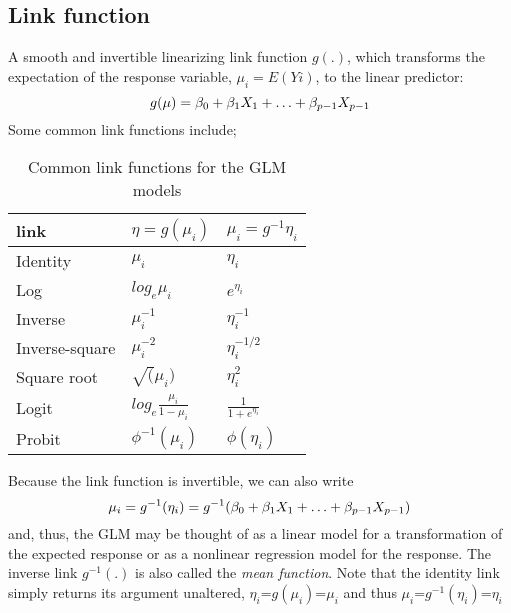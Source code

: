 \subsection{Link function}
A smooth and invertible linearizing link function $g(.)$, which transforms the expectation of the response variable, $\mu_i = E(Yi)$, to the linear predictor:
\begin{equation}
	\centering
	g(\mu) = \beta_0 + \beta_1 X_1 + \ldots + \beta_{p-1}X_{p-1} 
\end{equation}
Some common link functions include;
\begin{table}[H]
	\caption{Common link functions for the GLM models}
	\centering
	\begin{tabular}{@{}lll@{}}
		\toprule
		\textbf{link}           & \textbf{$\eta=g(\mu_{i})$} & \textbf{$\mu_i=g^{-1}\eta_i$} \\ \midrule
		Identity       & $\mu_i$                                                & $\eta_i$                                                                              \\
		Log            & $log_{e}\mu_i$                                             & $e^{\eta_i}$                                                                         \\
		Inverse        & $\mu_{i}^{-1}$                                        &$\eta_{i}^{-1}$                                                                      \\
		Inverse-square & $\mu_{i}^{-2}$                                 & $\eta_{i}^{-1/2}$                                                                    \\
		Square root    & $\sqrt(\mu_i)$                                          & $\eta_{i}^2$                                                                       \\
		Logit          & $log_e \frac{\mu_i}{1-\mu_i}$                             & $\frac{1}{1+e^{\eta_{i}}}$                                                                        \\
		Probit         & $\phi^{-1}(\mu_i)$ &$\phi(\eta_{i})$                                                                                                          \\ \bottomrule
	\end{tabular}
\end{table}
Because the link function is invertible, we can also write
\begin{equation}
	\centering
	\mu_{i}=g^{-1}(\eta_{i})=g^{-1}(\beta_0 + \beta_1 X_1 + \ldots + \beta_{p-1}X_{p-1})
\end{equation}
and, thus, the GLM may be thought of as a linear model for a transformation of the expected
response or as a nonlinear regression model for the response. The inverse link $g^{-1}(.)$ is also called the \textit{mean function}.  Note that the identity link simply returns its argument unaltered, $\eta_{i}$=$g(\mu_{i})$=$\mu_{i}$ and thus $\mu_{i}$=$g^{-1}(\eta_{i})$=$\eta_{i}$


